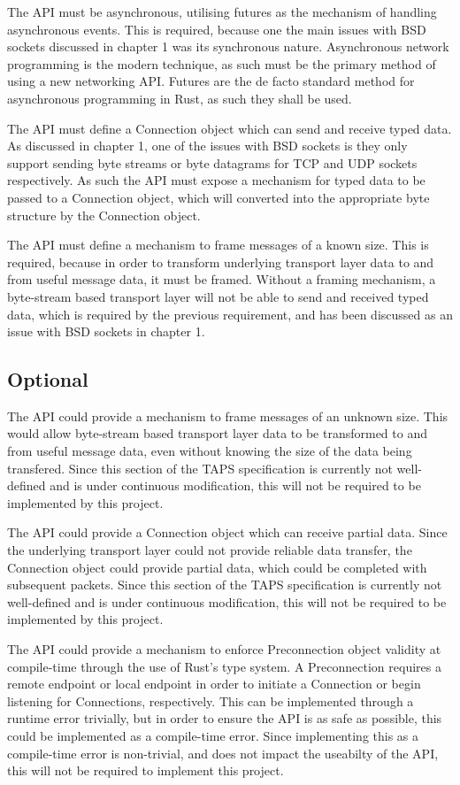 \documentclass{l4proj}
\begin{document}
The API must be asynchronous, utilising futures as the mechanism of handling asynchronous events.
This is required, because one the main issues with BSD sockets discussed in chapter 1 was its synchronous nature.
Asynchronous network programming is the modern technique, as such must be the primary method of using a new networking API.
Futures are the de facto standard method for asynchronous programming in Rust, as such they shall be used.

The API must define a Connection object which can send and receive typed data.
As discussed in chapter 1, one of the issues with BSD sockets is they only support sending byte streams or byte datagrams for
TCP and UDP sockets respectively.
As such the API must expose a mechanism for typed data to be passed to a Connection object, which will converted into the appropriate
byte structure by the Connection object.

The API must define a mechanism to frame messages of a known size.
This is required, because in order to transform underlying transport layer data to and from useful message data, it must be framed.
Without a framing mechanism, a byte-stream based transport layer will not be able to send and received typed data, which is required
by the previous requirement, and has been discussed as an issue with BSD sockets in chapter 1.

\subsection{Optional}

The API could provide a mechanism to frame messages of an unknown size.
This would allow byte-stream based transport layer data to be transformed to and from useful message data, even without knowing the
size of the data being transfered.
Since this section of the TAPS specification is currently not well-defined and is under continuous modification, this will not be
required to be implemented by this project.

The API could provide a Connection object which can receive partial data.
Since the underlying transport layer could not provide reliable data transfer, the Connection object could provide partial data,
which could be completed with subsequent packets.
Since this section of the TAPS specification is currently not well-defined and is under continuous modification, this will not be
required to be implemented by this project.

The API could provide a mechanism to enforce Preconnection object validity at compile-time through the use of Rust's type system.
A Preconnection requires a remote endpoint or local endpoint in order to initiate a Connection or begin listening for Connections,
respectively.
This can be implemented through a runtime error trivially, but in order to ensure the API is as safe as possible, this could be
implemented as a compile-time error.
Since implementing this as a compile-time error is non-trivial, and does not impact the useabilty of the API, this will not be
required to implement this project.
\end{document}

